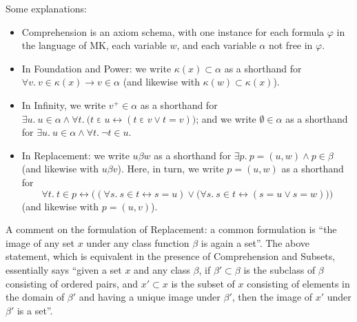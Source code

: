 \documentclass{amsart}
\newcommand\ein{\mathrel{\varepsilon}}
\newcommand\pbig[1]{\big({#1}\big)}
\renewcommand\phi{\varphi}
\newcommand\tot{\leftrightarrow}
\theoremstyle{definition}
\theoremstyle{remark}
\theoremstyle{plainwithref}
\begin{document}
Some explanations:
\begin{itemize}
\item Comprehension is an axiom schema, with one instance for each formula \( \phi \) in the language of MK, each variable \( w \), and each variable \( \alpha \) not free in \( \phi \).
\item In Foundation and Power: we write \( \kappa(x) \subset \alpha \) as a shorthand for \( \forall v.\ v \in \kappa(x) \to v \in \alpha \) (and likewise with \( \kappa(w) \subset \kappa(x) \)).
\item In Infinity, we write \( v^+ \in \alpha \) as a shorthand for \( \exists u.\ u \in \alpha \wedge \forall t.\ \pbig{t \ein u \tot (t \ein v \vee t = v)} \); and we write \( \emptyset \in \alpha \) as a shorthand for \( \exists u.\ u \in \alpha \wedge \forall t.\ \neg t \in u \).
\item In Replacement: we write \( u \beta w \) as a shorthand for \( \exists p.\ p = (u,w) \wedge p \in \beta \) (and likewise with \( u \beta v \)).
  Here, in turn, we write \( p = (u,w) \) as a shorthand for
  \[
    \forall t.\ t \in p \tot \pbig{(\forall s.\ s \in t \tot s = u)
    \vee \pbig{\forall s.\ s \in t \tot (s = u \vee s = w)}}
  \]
  (and likewise with \( p = (u, v) \)).
\end{itemize}

A comment on the formulation of Replacement:
a common formulation is ``the image of any set \( x \) under any class function \( \beta \) is again a set''.
The above statement, which is equivalent in the presence of Comprehension and Subsets, essentially says ``given a set \( x \) and any class \( \beta \), if \( \beta' \subset \beta \) is the subclass of \( \beta \) consisting of ordered pairs, and \( x' \subset x \) is the subset of \( x \) consisting of elements in the domain of \( \beta' \) and having a unique image under \( \beta' \), then the image of \( x' \) under \( \beta' \) is a set''.
\end{document}

